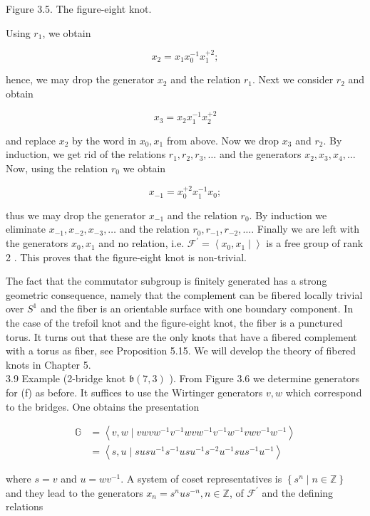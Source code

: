 \documentclass[10pt, letterpaper]{article}
\begin{document}
Figure 3.5. The figure-eight knot.

Using $r_{1}$, we obtain

$$
x_{2}=x_{1} x_{0}^{-1} x_{1}^{+2} ;
$$

hence, we may drop the generator $x_{2}$ and the relation $r_{1}$. Next we consider $r_{2}$ and obtain

$$
x_{3}=x_{2} x_{1}^{-1} x_{2}^{+2}
$$

and replace $x_{2}$ by the word in $x_{0}, x_{1}$ from above. Now we drop $x_{3}$ and $r_{2}$. By induction, we get rid of the relations $r_{1}, r_{2}, r_{3}, \ldots$ and the generators $x_{2}, x_{3}, x_{4}, \ldots$ Now, using the relation $r_{0}$ we obtain

$$
x_{-1}=x_{0}^{+2} x_{1}^{-1} x_{0} ;
$$

thus we may drop the generator $x_{-1}$ and the relation $r_{0}$. By induction we eliminate $x_{-1}, x_{-2}, x_{-3}, \ldots$ and the relation $r_{0}, r_{-1}, r_{-2}, \ldots$. Finally we are left with the generators $x_{0}, x_{1}$ and no relation, i.e. $\mathcal{F}^{\prime}=\left\langle x_{0}, x_{1} \mid\right\rangle$ is a free group of rank 2 . This proves that the figure-eight knot is non-trivial.

The fact that the commutator subgroup is finitely generated has a strong geometric consequence, namely that the complement can be fibered locally trivial over $S^{1}$ and the fiber is an orientable surface with one boundary component. In the case of the trefoil knot and the figure-eight knot, the fiber is a punctured torus. It turns out that these are the only knots that have a fibered complement with a torus as fiber, see Proposition 5.15. We will develop the theory of fibered knots in Chapter 5.\\
3.9 Example (2-bridge knot $\mathfrak{b}(7,3)$ ). From Figure 3.6 we determine generators for (f) as before. It suffices to use the Wirtinger generators $v, w$ which correspond to the bridges. One obtains the presentation

$$
\begin{aligned}
\mathbb{G} & =\left\langle v, w \mid v w v w^{-1} v^{-1} w v w^{-1} v^{-1} w^{-1} v w v^{-1} w^{-1}\right\rangle \\
& =\left\langle s, u \mid s u s u^{-1} s^{-1} u s u^{-1} s^{-2} u^{-1} s u s^{-1} u^{-1}\right\rangle
\end{aligned}
$$

where $s=v$ and $u=w v^{-1}$. A system of coset representatives is $\left\{s^{n} \mid n \in \mathbb{Z}\right\}$ and they lead to the generators $x_{n}=s^{n} u s^{-n}, n \in \mathbb{Z}$, of $\mathscr{F}^{\prime}$ and the defining relations
\end{document}
